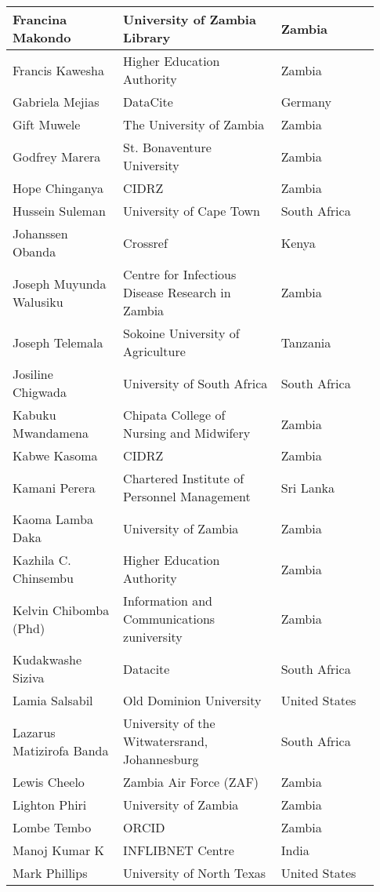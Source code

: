 \begin{center}
\begin{longtable}{p{0.28\linewidth} p{0.4\linewidth} p{0.25\linewidth}}
Francina Makondo & University of Zambia Library & Zambia \\  \hline
Francis Kawesha & Higher Education Authority & Zambia \\  \hline
Gabriela Mejias & DataCite & Germany \\  \hline
Gift Muwele & The University of Zambia & Zambia \\  \hline
Godfrey Marera & St. Bonaventure University & Zambia \\  \hline
Hope Chinganya & CIDRZ & Zambia \\  \hline
Hussein Suleman & University of Cape Town & South Africa \\  \hline
Johanssen Obanda & Crossref & Kenya \\  \hline
Joseph Muyunda Walusiku & Centre for Infectious Disease Research in Zambia & Zambia \\  \hline
Joseph Telemala & Sokoine University of Agriculture & Tanzania \\  \hline
Josiline Chigwada & University of South Africa & South Africa \\  \hline
Kabuku Mwandamena & Chipata College of Nursing and Midwifery & Zambia \\  \hline
Kabwe Kasoma & CIDRZ & Zambia \\  \hline
Kamani Perera & Chartered Institute of Personnel Management & Sri Lanka \\  \hline
Kaoma Lamba Daka & University of Zambia & Zambia \\  \hline
Kazhila C. Chinsembu & Higher Education Authority & Zambia \\  \hline
Kelvin Chibomba (Phd) & Information and Communications zuniversity & Zambia \\  \hline
Kudakwashe Siziva & Datacite & South Africa \\  \hline
Lamia Salsabil & Old Dominion University & United States \\  \hline
Lazarus Matizirofa Banda & University of the Witwatersrand, Johannesburg & South Africa \\  \hline
Lewis Cheelo & Zambia Air Force (ZAF) & Zambia \\  \hline
Lighton Phiri & University of Zambia & Zambia \\  \hline
Lombe Tembo & ORCID & Zambia \\  \hline
Manoj Kumar K & INFLIBNET Centre & India \\  \hline
Mark Phillips & University of North Texas & United States \\  \hline

\end{longtable}
\end{center}
